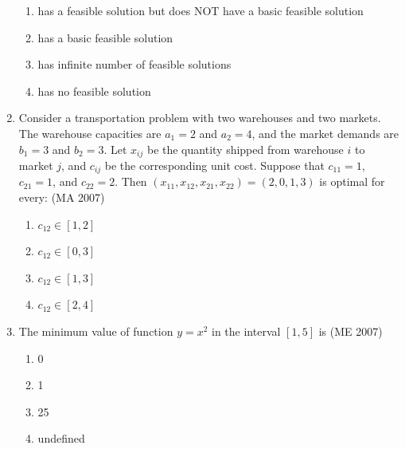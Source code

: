 \begin{enumerate}[label=\thesubsection.\arabic*,ref=\thesubsection.\theenumi]
    \begin{enumerate}
        \item has a feasible solution but does NOT have a basic feasible solution
        \item has a basic feasible solution
        \item has infinite number of feasible solutions
        \item has no feasible solution
    \end{enumerate}
    
\item  Consider a transportation problem with two warehouses and two markets. The warehouse capacities are $a_1 = 2$ and $a_2 = 4$, and the market demands are $b_1 = 3$ and $b_2 = 3$. Let $x_{ij}$ be the quantity shipped from warehouse $i$ to market $j$, and $c_{ij}$ be the corresponding unit cost. Suppose that $c_{11} = 1$, $c_{21} = 1$, and $c_{22} = 2$. Then $(x_{11}, x_{12}, x_{21}, x_{22}) = (2, 0, 1, 3)$ is optimal for every:
\hfill (MA 2007)
\begin{multicols}{2}
    \begin{enumerate}
        \item $c_{12} \in [1, 2]$
        \item $c_{12} \in [0, 3]$
        \item  $c_{12} \in [1, 3]$
        \item $c_{12} \in [2, 4]$
    \end{enumerate}
    \end{multicols}
\item The minimum value of function $ y = x^2 $ in the interval $[1,5]$ is
\hfill (ME 2007)
\begin{multicols}{4}
\begin{enumerate}
\item 0
\item 1
\item 25
\item undefined
\end{enumerate}
\end{multicols}


\end{enumerate}
